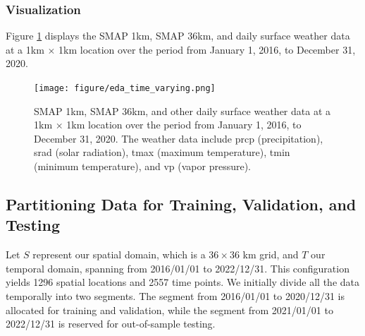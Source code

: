 \documentclass[11pt]{article}
\begin{document}
 


\subsubsection*{Visualization}
Figure \ref{fig: eda_time_varying} displays the SMAP 1km, SMAP 36km, and daily surface weather data at a 1km $\times$ 1km location over the period from January 1, 2016, to December 31, 2020. 

\begin{figure}[H]
\centering
\texttt{[image: figure/eda\_time\_varying.png]}
\caption{SMAP 1km, SMAP 36km, and other daily surface weather data at a 1km × 1km location over the period from January 1, 2016, to December 31, 2020. The weather data include prcp (precipitation), srad (solar radiation), tmax (maximum temperature), tmin (minimum temperature), and vp (vapor pressure).}
\label{fig: eda_time_varying}
\end{figure}










\subsection{Partitioning Data for Training, Validation, and Testing}
Let $S$ represent our spatial domain, which is a \(36 \times 36\) km grid, and $T$ our temporal domain, spanning from 2016/01/01 to 2022/12/31.
This configuration yields 1296 spatial locations and 2557 time points. We initially divide all the data temporally into two segments. The segment from 2016/01/01 to 2020/12/31 is allocated for training and validation, while the segment from 2021/01/01 to 2022/12/31 is reserved for out-of-sample testing.
\end{document}
